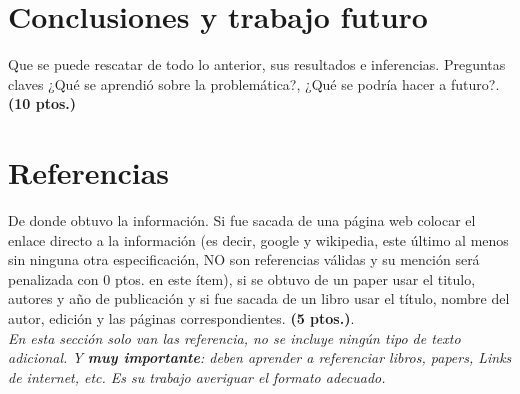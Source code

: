 \documentclass[journal, 10pt]{IEEEtran}
\begin{document}
\section{Conclusiones y trabajo futuro}

Que se puede rescatar de todo lo anterior, sus resultados e inferencias. Preguntas claves ¿Qué se aprendió sobre la problemática?, ¿Qué se podría hacer a futuro?. \textbf{(10 ptos.)}

\section{Referencias}

De donde obtuvo la información. Si fue sacada de una página web colocar el enlace directo a la información (es decir, google y wikipedia, este último al menos sin ninguna otra especificación, NO son referencias válidas y su mención será penalizada con 0 ptos. en este ítem), si se obtuvo de un paper usar el titulo, autores y año de publicación y si fue sacada de un libro usar el título, nombre del autor, edición y las páginas correspondientes. \textbf{(5 ptos.)}.\\

\textit{En esta sección solo van las referencia, no se incluye ningún tipo de texto adicional. Y \textbf{muy importante}: deben aprender a referenciar libros, papers, Links de internet, etc. Es su trabajo averiguar el formato adecuado.}




\end{document}
